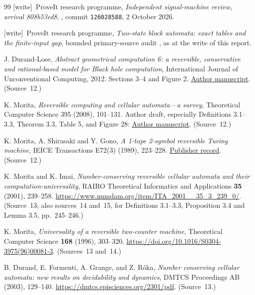 \documentclass[11pt,letterpaper]{article}
\numberwithin{equation}{section}
\theoremstyle{definition}
\theoremstyle{remark}
\newcommand{\wtag}{\textup{[write]}}
\begin{document}
\begin{thebibliography}{99}
\wtag\ ProveIt research programme, \emph{Independent signal-machine review, arrival 808b53ed8}, , commit \texttt{126028588}, 2 October 2026.

\wtag\ ProveIt research programme, \emph{Two-state block automata: exact tables and the finite-input gap}, bounded primary-source audit , as at the write of this report.

J. Durand-Lose, \emph{Abstract geometrical computation 6: a reversible, conservative and rational-based model for Black hole computation}, International Journal of Unconventional Computing, 2012. Sections 3--4 and Figure 2. \href{https://www.univ-orleans.fr/lifo/Members/Jerome.Durand-Lose/Recherche/Publications/2012_IJUC_UC_HC.pdf}{Author manuscript}.
(Source~12.)

K. Morita, \emph{Reversible computing and cellular automata---a survey}, Theoretical Computer Science 395 (2008), 101--131. Author draft, especially Definitions 3.1--3.3, Theorem 3.3, Table 5, and Figure 28: \href{https://hiroshima.repo.nii.ac.jp/record/2008964/files/TCS_395_101.pdf}{Author manuscript}.
(Source~12.)

K. Morita, A. Shirasaki and Y. Gono, \emph{A 1-tape 2-symbol reversible Turing machine}, IEICE Transactions E72(3) (1989), 223--228. \href{https://globals.ieice.org/en_transactions/transactions/10.1587/e72-e_3_223/_p}{Publisher record}.
(Source~12.)

K. Morita and K. Imai, \emph{Number-conserving reversible cellular automata and their computation-universality}, RAIRO Theoretical Informatics and Applications \textbf{35} (2001), 239--258. \url{https://www.numdam.org/item/ITA_2001__35_3_239_0/}.
(Source~13; also sources~14 and~15, for Definitions 3.1--3.3, Proposition 3.4 and Lemma 3.5, pp.~245--246.)

K. Morita, \emph{Universality of a reversible two-counter machine}, Theoretical Computer Science \textbf{168} (1996), 303--320. \url{https://doi.org/10.1016/S0304-3975(96)00081-3}.
(Sources~13 and~14.)

B. Durand, E. Formenti, A. Grange, and Z. R\'oka, \emph{Number conserving cellular automata: new results on decidability and dynamics}, DMTCS Proceedings AB (2003), 129--140. \url{https://dmtcs.episciences.org/2301/pdf}.
(Source~13.)


\end{thebibliography}
\end{document}
